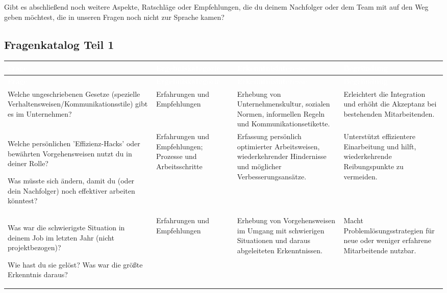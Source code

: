 \documentclass[
  10pt,
  ngerman,
  a4paper,
  toc=graduated,
  numbers=noenddot,
  headings=standardclasses,
  nonumberlist
]{scrartcl}
\renewcommand{\arraystretch}{1.0}
\begin{document}
Gibt es abschließend noch weitere Aspekte, Ratschläge oder Empfehlungen, die du deinem Nachfolger oder dem Team mit auf den Weg geben möchtest, die in unseren Fragen noch nicht zur Sprache kamen?

\clearpage
\subsection{Fragenkatalog Teil 1}
\label{anhang_fragenkatalog_1}

\setlength{\tabcolsep}{3.5pt}
\renewcommand{\arraystretch}{1.0}

\begin{longtable}{|L{4.9cm}|L{3.1cm}|L{3.8cm}|L{3.3cm}|}
\hline
{}
\textcolor{white}{\textbf{Frage}} &
\textcolor{white}{\textbf{Ergebniskategorie}} &
\textcolor{white}{\textbf{Erkenntnisinteresse}} &
\textcolor{white}{\textbf{Begründung}} \\
\hline
\endfirsthead

\hline
{}
\textcolor{white}{\textbf{Frage}} &
\textcolor{white}{\textbf{Ergebniskategorie}} &
\textcolor{white}{\textbf{Erkenntnisinteresse}} &
\textcolor{white}{\textbf{Begründung}} \\
\hline
\endhead

Welche ungeschriebenen Gesetze (spezielle Verhaltensweisen/Kommunikationsstile) gibt es im Unternehmen?
& Erfahrungen und Empfehlungen
& Erhebung von Unternehmenskultur, sozialen Normen, informellen Regeln und Kommunikationsetikette.
& Erleichtert die Integration und erhöht die Akzeptanz bei bestehenden Mitarbeitenden. \\
\hline

Welche persönlichen 'Effizienz-Hacks' oder bewährten Vorgehensweisen nutzt du in deiner Rolle?

Was müsste sich ändern, damit du (oder dein Nachfolger) noch effektiver arbeiten könntest?
& Erfahrungen und Empfehlungen; Prozesse und Arbeitsschritte
& Erfassung persönlich optimierter Arbeitsweisen, wiederkehrender Hindernisse und möglicher Verbesserungsansätze.
& Unterstützt effizientere Einarbeitung und hilft, wiederkehrende Reibungspunkte zu vermeiden. \\
\hline

Was war die schwierigste Situation in deinem Job im letzten Jahr (nicht projektbezogen)? 

Wie hast du sie gelöst? Was war die größte Erkenntnis daraus?
& Erfahrungen und Empfehlungen
& Erhebung von Vorgehensweisen im Umgang mit schwierigen Situationen und daraus abgeleiteten Erkenntnissen.
& Macht Problemlösungsstrategien für neue oder weniger erfahrene Mitarbeitende nutzbar. \\
\hline


\end{longtable}
\end{document}
